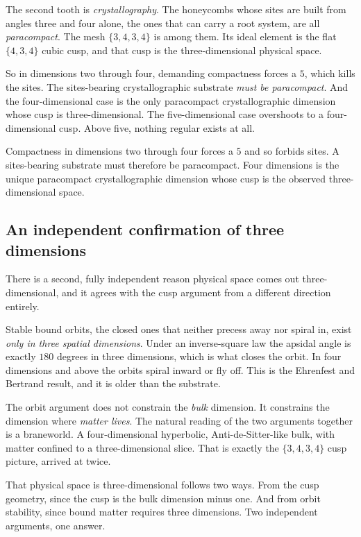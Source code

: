 The second tooth is \emph{crystallography}. The honeycombs whose sites are built from angles three and four alone, the ones that can carry a root system, are all \emph{paracompact}. The mesh $\{3,4,3,4\}$ is among them. Its ideal element is the flat $\{4,3,4\}$ cubic cusp, and that cusp is the three-dimensional physical space.

So in dimensions two through four, demanding compactness forces a $5$, which kills the sites. The sites-bearing crystallographic substrate \emph{must be paracompact}. And the four-dimensional case is the only paracompact crystallographic dimension whose cusp is three-dimensional. The five-dimensional case overshoots to a four-dimensional cusp. Above five, nothing regular exists at all.

\begin{principle}
Compactness in dimensions two through four forces a $5$ and so forbids sites. A sites-bearing substrate must therefore be paracompact. Four dimensions is the unique paracompact crystallographic dimension whose cusp is the observed three-dimensional space.
\end{principle}

\subsection{An independent confirmation of three dimensions}

There is a second, fully independent reason physical space comes out three-dimensional, and it agrees with the cusp argument from a different direction entirely.

Stable bound orbits, the closed ones that neither precess away nor spiral in, exist \emph{only in three spatial dimensions}. Under an inverse-square law the apsidal angle is exactly $180$ degrees in three dimensions, which is what closes the orbit. In four dimensions and above the orbits spiral inward or fly off. This is the Ehrenfest and Bertrand result, and it is older than the substrate.

The orbit argument does not constrain the \emph{bulk} dimension. It constrains the dimension where \emph{matter lives}. The natural reading of the two arguments together is a braneworld. A four-dimensional hyperbolic, Anti-de-Sitter-like bulk, with matter confined to a three-dimensional slice. That is exactly the $\{3,4,3,4\}$ cusp picture, arrived at twice.

\begin{result}
That physical space is three-dimensional follows two ways. From the cusp geometry, since the cusp is the bulk dimension minus one. And from orbit stability, since bound matter requires three dimensions. Two independent arguments, one answer.
\end{result}

